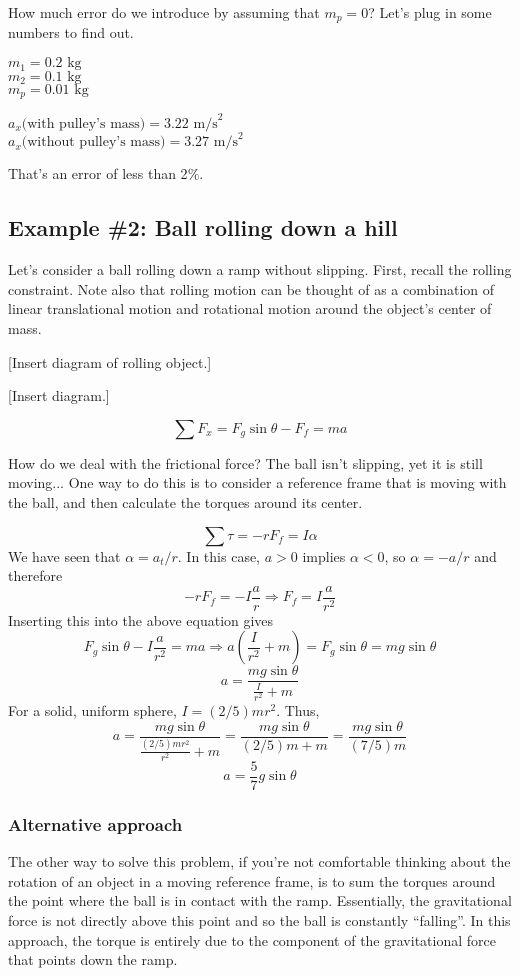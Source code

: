 How much error do we introduce by assuming that $m_p=0$? Let's plug in some numbers to find out.

$m_1=0.2\mbox{ kg}$\\
$m_2=0.1\mbox{ kg}$\\
$m_p=0.01\mbox{ kg}$

$a_x\mbox{(with pulley's mass)}=3.22\mbox{ m/s}^2$\\
$a_x\mbox{(without pulley's mass)}=3.27\mbox{ m/s}^2$

That's an error of less than 2$\%$.

\subsection{Example \#2: Ball rolling down a hill}
Let's consider a ball rolling down a ramp without slipping. First, recall the rolling constraint. Note also that rolling motion can be thought of as a combination of linear translational motion and rotational motion around the object's center of mass.

[Insert diagram of rolling object.]
\vspace{5cm}

[Insert diagram.]
\vspace{5cm}

\begin{equation}\sum F_x=F_g\sin\theta-F_f=ma \end{equation}

How do we deal with the frictional force? The ball isn't slipping, yet it is still moving... One way to do this is to consider a reference frame that is moving with the ball, and then calculate the torques around its center.

\begin{equation}\sum\tau=-rF_f=I\alpha \end{equation}
We have seen that $\alpha=a_t/r$. In this case, $a>0$ implies $\alpha<0$, so $\alpha=-a/r$ and therefore
$$-rF_f=-I\frac{a}{r}\Rightarrow F_f=I\frac{a}{r^2}$$
Inserting this into the above equation gives
$$F_g\sin\theta-I\frac{a}{r^2}=ma\Rightarrow a\left(\frac{I}{r^2}+m\right)=F_g\sin\theta=mg\sin\theta$$
$$a=\frac{mg\sin\theta}{\frac{I}{r^2}+m}$$
For a solid, uniform sphere, $I=(2/5)mr^2$. Thus,
$$a=\frac{mg\sin\theta}{\frac{(2/5)mr^2}{r^2}+m}=\frac{mg\sin\theta}{(2/5)m+m}=\frac{mg\sin\theta}{(7/5)m}$$
$$\boxed{a=\frac{5}{7}g\sin\theta}$$


\subsubsection*{Alternative approach}
The other way to solve this problem, if you're not comfortable thinking about the rotation of an object in a moving reference frame, is to sum the torques around the point where the ball is in contact with the ramp. Essentially, the gravitational force is not directly above this point and so the ball is constantly ``falling''. In this approach, the torque is entirely due to the component of the gravitational force that points down the ramp.

